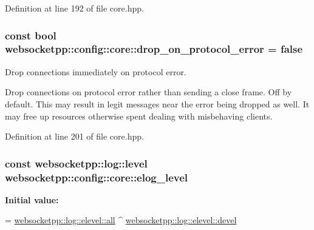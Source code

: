 Definition at line 192 of file core.\+hpp.

\hypertarget{structwebsocketpp_1_1config_1_1core_aa103c2e42ba4c43a34e918048b478890}{}
\subsubsection[{drop\+\_\+on\+\_\+protocol\+\_\+error}]{\setlength{\rightskip}{0pt plus 5cm}const bool websocketpp\+::config\+::core\+::drop\+\_\+on\+\_\+protocol\+\_\+error = false\hspace{0.3cm}{\ttfamily [static]}}\label{structwebsocketpp_1_1config_1_1core_aa103c2e42ba4c43a34e918048b478890}


Drop connections immediately on protocol error. 

Drop connections on protocol error rather than sending a close frame. Off by default. This may result in legit messages near the error being dropped as well. It may free up resources otherwise spent dealing with misbehaving clients. 

Definition at line 201 of file core.\+hpp.

\hypertarget{structwebsocketpp_1_1config_1_1core_a31a33f2fdcf9cabf04995367ce473c77}{}
\subsubsection[{elog\+\_\+level}]{\setlength{\rightskip}{0pt plus 5cm}const {\bf websocketpp\+::log\+::level} websocketpp\+::config\+::core\+::elog\+\_\+level\hspace{0.3cm}{\ttfamily [static]}}\label{structwebsocketpp_1_1config_1_1core_a31a33f2fdcf9cabf04995367ce473c77}
{\bfseries Initial value\+:}
\begin{DoxyCode}
=
        \hyperlink{structwebsocketpp_1_1log_1_1elevel_a9b31ff708c221d314f9f4eb3ff2b1ad7}{websocketpp::log::elevel::all} ^ 
      \hyperlink{structwebsocketpp_1_1log_1_1elevel_a0b1dbc650c6f2711522c096496423726}{websocketpp::log::elevel::devel}
\end{DoxyCode}


